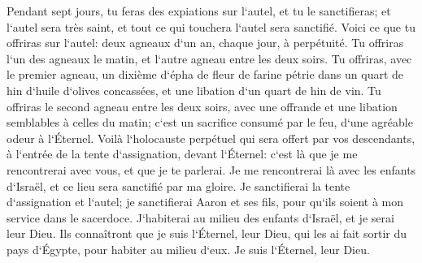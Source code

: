 \verse Pendant sept jours, tu feras des expiations sur l`autel, et tu le sanctifieras; et l`autel sera très saint, et tout ce qui touchera l`autel sera sanctifié. 
\verse Voici ce que tu offriras sur l`autel: deux agneaux d`un an, chaque jour, à perpétuité. 
\verse Tu offriras l`un des agneaux le matin, et l`autre agneau entre les deux soirs. 
\verse Tu offriras, avec le premier agneau, un dixième d`épha de fleur de farine pétrie dans un quart de hin d`huile d`olives concassées, et une libation d`un quart de hin de vin. 
\verse Tu offriras le second agneau entre les deux soirs, avec une offrande et une libation semblables à celles du matin; c`est un sacrifice consumé par le feu, d`une agréable odeur à l`Éternel. 
\verse Voilà l`holocauste perpétuel qui sera offert par vos descendants, à l`entrée de la tente d`assignation, devant l`Éternel: c`est là que je me rencontrerai avec vous, et que je te parlerai. 
\verse Je me rencontrerai là avec les enfants d`Israël, et ce lieu sera sanctifié par ma gloire. 
\verse Je sanctifierai la tente d`assignation et l`autel; je sanctifierai Aaron et ses fils, pour qu`ils soient à mon service dans le sacerdoce. 
\verse J`habiterai au milieu des enfants d`Israël, et je serai leur Dieu. 
\verse Ils connaîtront que je suis l`Éternel, leur Dieu, qui les ai fait sortir du pays d`Égypte, pour habiter au milieu d`eux. Je suis l`Éternel, leur Dieu. 

